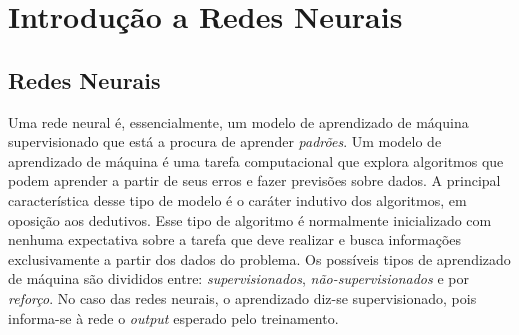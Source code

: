\chapter{Introdução a Redes Neurais}
\label{ch:03}



\section{Redes Neurais}

Uma rede neural é, essencialmente, um modelo de aprendizado de máquina supervisionado %
que está a procura de aprender \textit{padrões}. Um modelo de aprendizado de máquina é uma tarefa computacional que explora algoritmos que podem aprender a partir de seus erros e fazer previsões sobre dados. A principal característica desse tipo de modelo é o caráter indutivo dos algoritmos, em oposição aos dedutivos. Esse tipo de algoritmo é normalmente inicializado com nenhuma expectativa sobre a tarefa que deve realizar e busca informações exclusivamente a partir dos dados do problema. Os possíveis tipos de aprendizado de máquina são divididos entre: \textit{supervisionados}, \textit{não-supervisionados} %
e por \textit{reforço}. %
No caso das redes neurais, o aprendizado diz-se supervisionado, pois informa-se à rede o \textit{output} esperado pelo treinamento.

